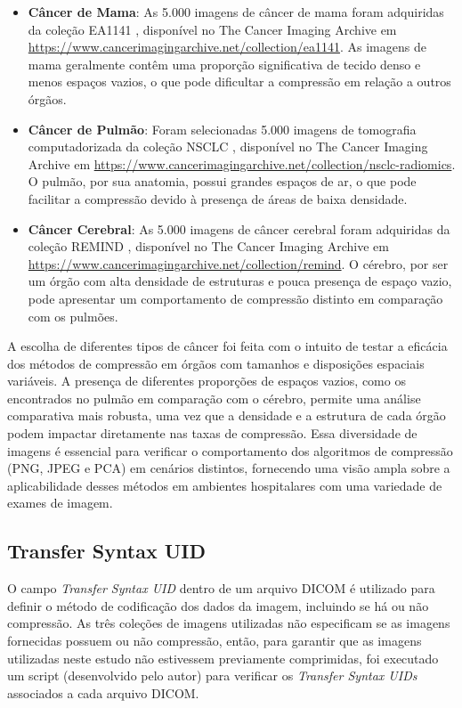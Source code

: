 \begin{itemize}
    \item \textbf{Câncer de Mama}: As 5.000 imagens de câncer de mama foram adquiridas da coleção \acrfull{EA1141} \cite{breastCancerCollection}, disponível no The Cancer Imaging Archive em \url{https://www.cancerimagingarchive.net/collection/ea1141}. As imagens de mama geralmente contêm uma proporção significativa de tecido denso e menos espaços vazios, o que pode dificultar a compressão em relação a outros órgãos.

    \item \textbf{Câncer de Pulmão}: Foram selecionadas 5.000 imagens de tomografia computadorizada da coleção \acrfull{NSCLC} \cite{lungCancerCollection}, disponível no The Cancer Imaging Archive em \url{https://www.cancerimagingarchive.net/collection/nsclc-radiomics}. O pulmão, por sua anatomia, possui grandes espaços de ar, o que pode facilitar a compressão devido à presença de áreas de baixa densidade.
    
    \item \textbf{Câncer Cerebral}: As 5.000 imagens de câncer cerebral foram adquiridas da coleção \acrfull{REMIND} \cite{brainCancerCollection}, disponível no The Cancer Imaging Archive em \url{https://www.cancerimagingarchive.net/collection/remind}. O cérebro, por ser um órgão com alta densidade de estruturas e pouca presença de espaço vazio, pode apresentar um comportamento de compressão distinto em comparação com os pulmões.
\end{itemize}

A escolha de diferentes tipos de câncer foi feita com o intuito de testar a eficácia dos métodos de compressão em órgãos com tamanhos e disposições espaciais variáveis. A presença de diferentes proporções de espaços vazios, como os encontrados no pulmão em comparação com o cérebro, permite uma análise comparativa mais robusta, uma vez que a densidade e a estrutura de cada órgão podem impactar diretamente nas taxas de compressão. Essa diversidade de imagens é essencial para verificar o comportamento dos algoritmos de compressão (\acrshort{PNG}, \acrshort{JPEG} e \acrshort{PCA}) em cenários distintos, fornecendo uma visão ampla sobre a aplicabilidade desses métodos em ambientes hospitalares com uma variedade de exames de imagem.

\subsection{Transfer Syntax UID}
O campo \textit{Transfer Syntax UID} dentro de um arquivo DICOM é utilizado para definir o método de codificação dos dados da imagem, incluindo se há ou não compressão. As três coleções de imagens utilizadas não especificam se as imagens fornecidas possuem ou não compressão, então, para garantir que as imagens utilizadas neste estudo não estivessem previamente comprimidas, foi executado um script (desenvolvido pelo autor) para verificar os \textit{Transfer Syntax UIDs} associados a cada arquivo DICOM.

